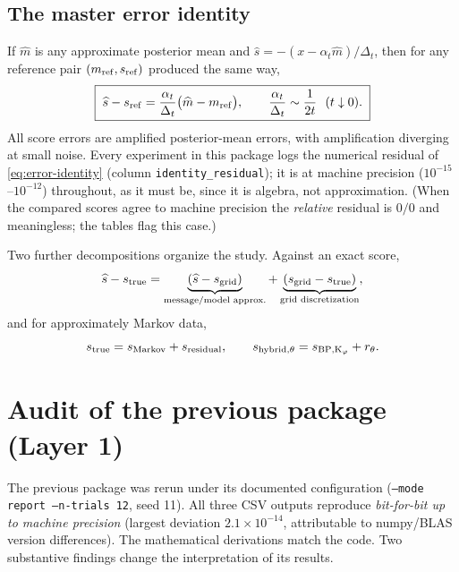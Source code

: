 \documentclass[11pt]{article}
\begin{document}
\subsection{The master error identity}

If $\widehat m$ is any approximate posterior mean and
$\widehat s = -(x-\alpha_t\widehat m)/\Delta_t$, then for any reference pair
$(m_{\rm ref},s_{\rm ref})$ produced the same way,
\begin{equation}
  \boxed{\;\widehat s - s_{\rm ref} = \frac{\alpha_t}{\Delta_t}
  \bigl(\widehat m - m_{\rm ref}\bigr),\qquad
  \frac{\alpha_t}{\Delta_t}\sim\frac{1}{2t}\ \ (t\downarrow0).\;}
  \label{eq:error-identity}
\end{equation}
All score errors are amplified posterior-mean errors, with amplification diverging at
small noise. Every experiment in this package logs the numerical residual of
\eqref{eq:error-identity} (column \texttt{identity\_residual}); it is at machine
precision ($10^{-15}$--$10^{-12}$) throughout, as it must be, since it is algebra, not
approximation. (When the compared scores agree to machine precision the \emph{relative}
residual is $0/0$ and meaningless; the tables flag this case.)

Two further decompositions organize the study. Against an exact score,
\begin{equation}
  \widehat s - s_{\rm true}
  = \underbrace{(\widehat s - s_{\rm grid})}_{\text{message/model approx.}}
  + \underbrace{(s_{\rm grid} - s_{\rm true})}_{\text{grid discretization}},
\end{equation}
and for approximately Markov data,
\begin{equation}
  s_{\rm true} = s_{\rm Markov} + s_{\rm residual},
  \qquad
  s_{\rm hybrid,\theta} = s_{\rm BP,K_\varphi} + r_\theta .
  \label{eq:residual-decomp}
\end{equation}

\section{Audit of the previous package (Layer 1)}

The previous package was rerun under its documented configuration
(\texttt{--mode report --n-trials 12}, seed 11). All three CSV outputs reproduce
\emph{bit-for-bit up to machine precision} (largest deviation $2.1\times10^{-14}$,
attributable to numpy/BLAS version differences). The mathematical derivations match
the code. Two substantive findings change the interpretation of its results.
\end{document}
